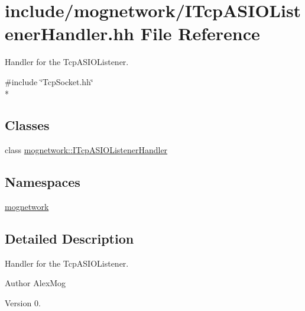 \hypertarget{_i_tcp_a_s_i_o_listener_handler_8hh}{\section{include/mognetwork/\-I\-Tcp\-A\-S\-I\-O\-Listener\-Handler.hh File Reference}
\label{_i_tcp_a_s_i_o_listener_handler_8hh}
}


Handler for the Tcp\-A\-S\-I\-O\-Listener.  


{\ttfamily \#include \char`\"{}Tcp\-Socket.\-hh\char`\"{}}\\*
\subsection*{Classes}
\begin{DoxyCompactItemize}
\item 
class \hyperlink{classmognetwork_1_1_i_tcp_a_s_i_o_listener_handler}{mognetwork\-::\-I\-Tcp\-A\-S\-I\-O\-Listener\-Handler}
\end{DoxyCompactItemize}
\subsection*{Namespaces}
\begin{DoxyCompactItemize}
\item 
\hyperlink{namespacemognetwork}{mognetwork}
\end{DoxyCompactItemize}


\subsection{Detailed Description}
Handler for the Tcp\-A\-S\-I\-O\-Listener. \begin{DoxyAuthor}{Author}
Alex\-Mog 
\end{DoxyAuthor}
\begin{DoxyVersion}{Version}
0. 
\end{DoxyVersion}
